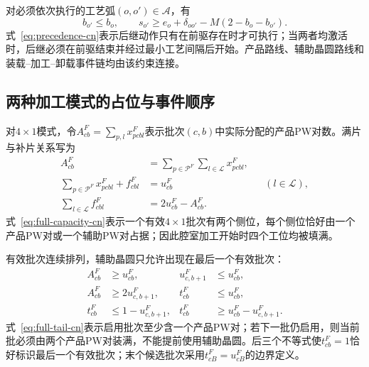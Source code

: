 \documentclass[journal]{IEEEtran}
\begin{document}
对必须依次执行的工艺弧$(o,o')\in\mathcal A$，有
\begin{equation}
b_{o'}\le b_o,\qquad
s_{o'}\ge e_o+\delta_{oo'}-M(2-b_o-b_{o'}).
\label{eq:precedence-cn}
\end{equation}
式~\eqref{eq:precedence-cn}表示后继动作只有在前驱存在时才可执行；当两者均激活时，后继必须在前驱结束并经过最小工艺间隔后开始。产品路线、辅助晶圆路线和装载--加工--卸载事件链均由该约束连接。

\subsection{两种加工模式的占位与事件顺序}

对$4\times1$模式，令$A^F_{cb}=\sum_{p,l}x^F_{pcbl}$表示批次$(c,b)$中实际分配的产品PW对数。满片与补片关系写为
\begin{equation}
\begin{aligned}
A^F_{cb}&=\sum_{p\in\mathcal P^F}\sum_{l\in\mathcal L}x^F_{pcbl},\\
\sum_{p\in\mathcal P^F}x^F_{pcbl}+f^F_{cbl}&=u^F_{cb}
&& (l\in\mathcal L),\\
\sum_{l\in\mathcal L}f^F_{cbl}&=2u^F_{cb}-A^F_{cb}.
\end{aligned}
\label{eq:full-capacity-cn}
\end{equation}
式~\eqref{eq:full-capacity-cn}表示一个有效$4\times1$批次有两个侧位，每个侧位恰好由一个产品PW对或一个辅助PW对占据；因此腔室加工开始时四个工位均被填满。

有效批次连续排列，辅助晶圆只允许出现在最后一个有效批次：
\begin{equation}
\begin{aligned}
A^F_{cb}&\ge u^F_{cb}, &u^F_{c,b+1}&\le u^F_{cb},\\
A^F_{cb}&\ge2u^F_{c,b+1},
&t^F_{cb}&\le u^F_{cb},\\
t^F_{cb}&\le1-u^F_{c,b+1},
&t^F_{cb}&\ge u^F_{cb}-u^F_{c,b+1}.
\end{aligned}
\label{eq:full-tail-cn}
\end{equation}
式~\eqref{eq:full-tail-cn}表示启用批次至少含一个产品PW对；若下一批仍启用，则当前批必须由两个产品PW对装满，不能提前使用辅助晶圆。后三个不等式使$t^F_{cb}=1$恰好标识最后一个有效批次；末个候选批次采用$t^F_{cB}=u^F_{cB}$的边界定义。
\end{document}

